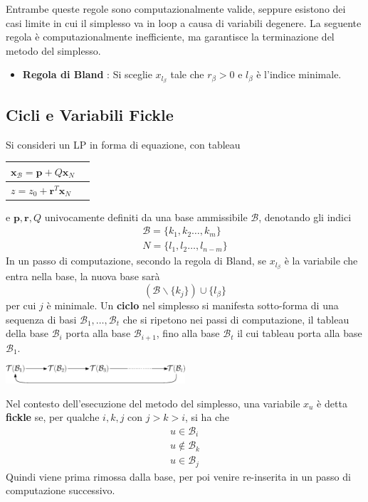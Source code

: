 \documentclass[10pt, letterpaper]{report}
\begin{document}
Entrambe queste regole sono computazionalmente valide, seppure esistono dei casi limite in cui il simplesso va in loop a causa di variabili degenere. La seguente regola è computazionalmente inefficiente, ma garantisce la terminazione del metodo del simplesso.\begin{itemize}
    \item \textbf{Regola di Bland} : Si sceglie $x_{l_\beta}$ tale che $r_\beta>0$ e $l_\beta$ è l'indice minimale.
\end{itemize}
\subsection{Cicli e Variabili Fickle}
Si consideri un LP in forma di equazione, con tableau 
\begin{center}
    \begin{tabular}{|l|l|}\hline 
       $\mathbf{x}_\mathcal{B} = \mathbf p + Q\mathbf x_N$\\ \hline 
       $z=z_0+\mathbf r^T\mathbf x_N$ \\\hline 
    \end{tabular}
\end{center}
e $\mathbf p,\mathbf r, Q$ univocamente definiti da una base ammissibile $\mathcal B$, denotando gli indici
\begin{eqnarray*}
    \mathcal B = \{k_1,k_2\dots,k_m\}\\ 
    N=\{l_1,l_2\dots, l_{n-m}\}
\end{eqnarray*}
In un passo di computazione, secondo la regola di Bland, se $x_{l_\beta}$ è la variabile che entra nella base, la nuova base sarà 
$$ (\mathcal B \backslash \{k_j\}) \cup \{l_\beta\}$$
per cui $j$ è minimale. Un \textbf{ciclo} nel simplesso si manifesta sotto-forma di una sequenza di basi $\mathcal B_1,\dots,\mathcal B_t$ che si ripetono nei passi di computazione, il tableau della base $\mathcal B_i$ porta alla base $\mathcal B_{i+1}$, fino alla base $\mathcal B_t$ il cui tableau porta alla base $\mathcal B_1$.\begin{center}
    \includegraphics[width=0.5\textwidth ]{images/cicloSimplex.eps}
\end{center}
\begin{definizione}
    Nel contesto dell'esecuzione del metodo del simplesso, una variabile $x_u$ è detta \textbf{fickle} se, per qualche $i,k,j$ con $j>k>i$, si ha che 
    $$\begin{matrix}
             u\in{\mathcal B}_i\\ 
             u\notin{\mathcal B}_k\\ 
             u\in{\mathcal B}_j
    \end{matrix}$$
    Quindi viene prima rimossa dalla base, per poi venire re-inserita in un passo di computazione successivo.
\end{definizione}
\end{document}
